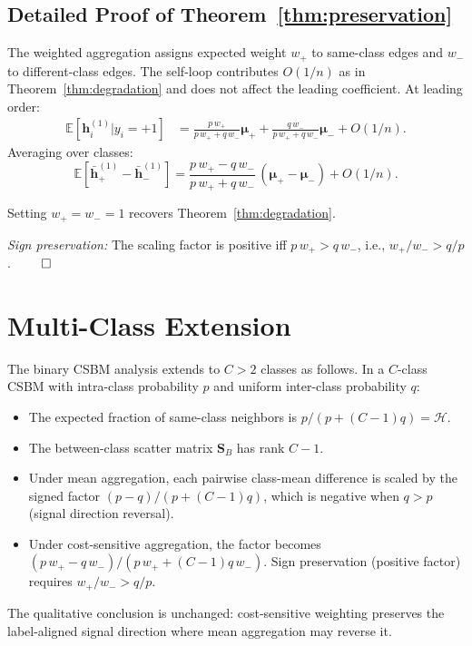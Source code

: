 \documentclass[runningheads]{llncs}
\newcommand{\E}{\mathbb{E}}
\newcommand{\bh}{\mathbf{h}}
\begin{document}
\subsection{Detailed Proof of Theorem~\ref{thm:preservation}}

The weighted aggregation assigns expected weight $w_+$ to same-class edges and $w_-$ to different-class edges.
The self-loop contributes $O(1/n)$ as in Theorem~\ref{thm:degradation} and does not affect the leading coefficient.
At leading order:
\begin{align}
    \E[\bh_i^{(1)} | y_i = +1] &= \frac{p\, w_+}{p\, w_+ + q\, w_-}\boldsymbol{\mu}_+ + \frac{q\, w_-}{p\, w_+ + q\, w_-}\boldsymbol{\mu}_- + O(1/n).
\end{align}
Averaging over classes:
\begin{equation}
    \E[\bar{\bh}_+^{(1)} - \bar{\bh}_-^{(1)}] = \frac{p\,w_+ - q\,w_-}{p\,w_+ + q\,w_-}\,(\boldsymbol{\mu}_+ - \boldsymbol{\mu}_-) + O(1/n).
\end{equation}

Setting $w_+=w_-=1$ recovers Theorem~\ref{thm:degradation}.

\emph{Sign preservation:} The scaling factor is positive iff $p\,w_+ > q\,w_-$, i.e., $w_+/w_- > q/p$. $\qed$


\section{Multi-Class Extension}\label{app:multiclass}

The binary CSBM analysis extends to $C > 2$ classes as follows.
In a $C$-class CSBM with intra-class probability $p$ and uniform inter-class probability $q$:
\begin{itemize}
    \item The expected fraction of same-class neighbors is $p/(p + (C-1)q) = \mathcal{H}$.
    \item The between-class scatter matrix $\mathbf{S}_B$ has rank $C-1$.
    \item Under mean aggregation, each pairwise class-mean difference is scaled by the signed factor $(p - q)/(p + (C-1)q)$, which is negative when $q > p$ (signal direction reversal).
    \item Under cost-sensitive aggregation, the factor becomes $(p\,w_+ - q\,w_-)/(p\,w_+ + (C-1)q\,w_-)$. Sign preservation (positive factor) requires $w_+/w_- > q/p$.
\end{itemize}
The qualitative conclusion is unchanged: cost-sensitive weighting preserves the label-aligned signal direction where mean aggregation may reverse it.
\end{document}
